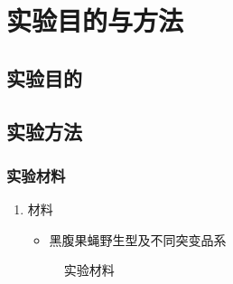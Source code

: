 \documentclass[AutoFakeBold]{LZUThesis}
\begin{document}
\chapter{实验目的与方法}
\section{实验目的}
\section{实验方法}
\subsection{实验材料}
\begin{enumerate}
    \item 材料
    \begin{itemize}
        \item 黑腹果蝇野生型及不同突变品系
    \end{itemize}
        \begin{figure}[htbp]
            \centering
            \hfill
        \caption{实验材料}
    \label{fig:materials}
\end{figure}


\end{enumerate}
\end{document}
